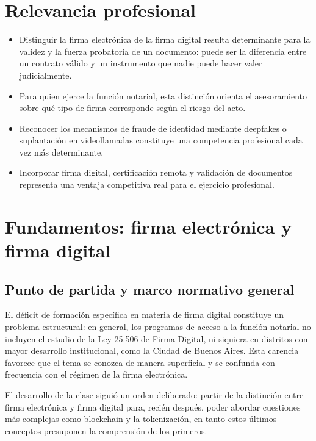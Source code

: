 \documentclass[12pt,oneside]{book}
\begin{document}
\section*{Relevancia profesional}
\begin{itemize}
    \item Distinguir la firma electrónica de la firma digital resulta determinante para la validez y la fuerza probatoria de un documento: puede ser la diferencia entre un contrato válido y un instrumento que nadie puede hacer valer judicialmente.
    \item Para quien ejerce la función notarial, esta distinción orienta el asesoramiento sobre qué tipo de firma corresponde según el riesgo del acto.
    \item Reconocer los mecanismos de fraude de identidad mediante deepfakes o suplantación en videollamadas constituye una competencia profesional cada vez más determinante.
    \item Incorporar firma digital, certificación remota y validación de documentos representa una ventaja competitiva real para el ejercicio profesional.
\end{itemize}

\section{Fundamentos: firma electrónica y firma digital}

\subsection{Punto de partida y marco normativo general}

El déficit de formación específica en materia de firma digital constituye un problema estructural: en general, los programas de acceso a la función notarial no incluyen el estudio de la Ley 25.506 de Firma Digital, ni siquiera en distritos con mayor desarrollo institucional, como la Ciudad de Buenos Aires. Esta carencia favorece que el tema se conozca de manera superficial y se confunda con frecuencia con el régimen de la firma electrónica.

El desarrollo de la clase siguió un orden deliberado: partir de la distinción entre firma electrónica y firma digital para, recién después, poder abordar cuestiones más complejas como blockchain y la tokenización, en tanto estos últimos conceptos presuponen la comprensión de los primeros.
\end{document}
